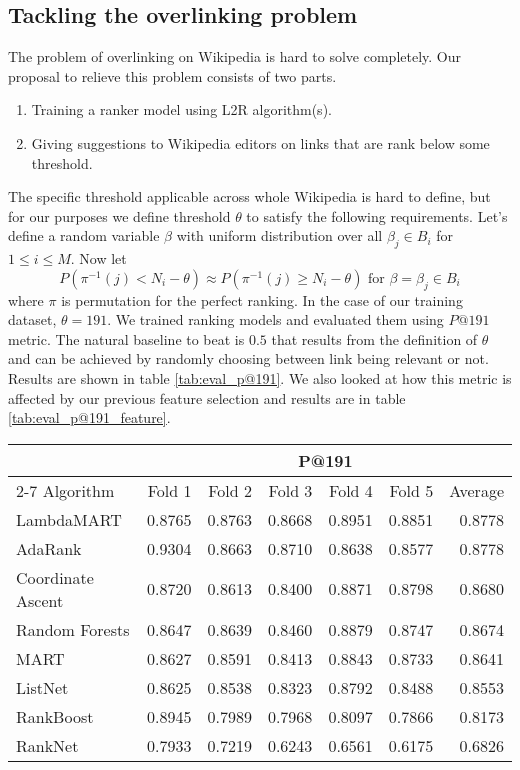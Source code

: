 \subsection{Tackling the overlinking problem}
The problem of overlinking on Wikipedia is hard to solve completely. Our proposal to relieve this problem consists of two parts.
\begin{enumerate}
\item Training a ranker model using L2R algorithm(s).
\item Giving suggestions to Wikipedia editors on links that are rank below some threshold.
\end{enumerate}
The specific threshold applicable across whole Wikipedia is hard to define, but for our purposes we define threshold $\theta$ to satisfy the following requirements. Let's define a random variable $\beta$ with uniform distribution over all $\beta_j \in B_i$ for $1 \le i \le M$. Now let $$ P(\pi^{-1}(j) < N_i-\theta) \approx P(\pi^{-1}(j) \ge N_i-\theta) \text{ for } \beta = \beta_j \in B_i$$ where $\pi$ is permutation for the perfect ranking. In the case of our training dataset, $\theta = 191$. We trained ranking models and evaluated them using $P@191$ metric. The natural baseline to beat is $0.5$ that results from the definition of $\theta$ and can be achieved by randomly choosing between link being relevant or not. Results are shown in table \ref{tab:eval_p@191}. We also looked at how this metric is affected by our previous feature selection and results are in table \ref{tab:eval_p@191_feature}.

\begin{table*}[p]
\caption{Evaluation of different L2R algorithms trained on all features using P@191}
\centering
\label{tab:eval_p@191}
\begin{tabular}{lrrrrrr}
\toprule
& \multicolumn{6}{c}{P@191} \\
\cmidrule{2-7}
Algorithm & Fold 1 & Fold 2 & Fold 3 & Fold 4 & Fold 5 & Average \\
\midrule
LambdaMART & 0.8765 & 0.8763 & 0.8668 & 0.8951 & 0.8851 & 0.8778 \\
AdaRank & 0.9304 & 0.8663 & 0.8710 & 0.8638 & 0.8577 & 0.8778 \\
Coordinate Ascent & 0.8720 & 0.8613 & 0.8400 & 0.8871 & 0.8798 & 0.8680 \\
Random Forests & 0.8647 & 0.8639 & 0.8460 & 0.8879 & 0.8747 & 0.8674 \\
MART & 0.8627 & 0.8591 & 0.8413 & 0.8843 & 0.8733 & 0.8641 \\
ListNet & 0.8625 & 0.8538 & 0.8323 & 0.8792 & 0.8488 & 0.8553 \\
RankBoost & 0.8945 & 0.7989 & 0.7968 & 0.8097 & 0.7866 & 0.8173 \\
RankNet & 0.7933 & 0.7219 & 0.6243 & 0.6561 & 0.6175 & 0.6826 \\
\bottomrule
\end{tabular}
\end{table*}

